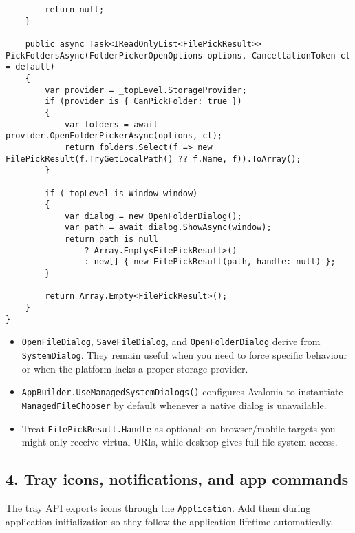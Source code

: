 \begin{lstlisting}
        return null;
    }

    public async Task<IReadOnlyList<FilePickResult>> PickFoldersAsync(FolderPickerOpenOptions options, CancellationToken ct = default)
    {
        var provider = _topLevel.StorageProvider;
        if (provider is { CanPickFolder: true })
        {
            var folders = await provider.OpenFolderPickerAsync(options, ct);
            return folders.Select(f => new FilePickResult(f.TryGetLocalPath() ?? f.Name, f)).ToArray();
        }

        if (_topLevel is Window window)
        {
            var dialog = new OpenFolderDialog();
            var path = await dialog.ShowAsync(window);
            return path is null
                ? Array.Empty<FilePickResult>()
                : new[] { new FilePickResult(path, handle: null) };
        }

        return Array.Empty<FilePickResult>();
    }
}
\end{lstlisting}

\begin{itemize}
\tightlist
\item
  \passthrough{\lstinline!OpenFileDialog!},
  \passthrough{\lstinline!SaveFileDialog!}, and
  \passthrough{\lstinline!OpenFolderDialog!} derive from
  \passthrough{\lstinline!SystemDialog!}. They remain useful when you
  need to force specific behaviour or when the platform lacks a proper
  storage provider.
\item
  \passthrough{\lstinline!AppBuilder.UseManagedSystemDialogs()!}
  configures Avalonia to instantiate
  \passthrough{\lstinline!ManagedFileChooser!} by default whenever a
  native dialog is unavailable.
\item
  Treat \passthrough{\lstinline!FilePickResult.Handle!} as optional: on
  browser/mobile targets you might only receive virtual URIs, while
  desktop gives full file system access.
\end{itemize}

\subsection{4. Tray icons, notifications, and app
commands}\label{tray-icons-notifications-and-app-commands}

The tray API exports icons through the
\passthrough{\lstinline!Application!}. Add them during application
initialization so they follow the application lifetime automatically.

